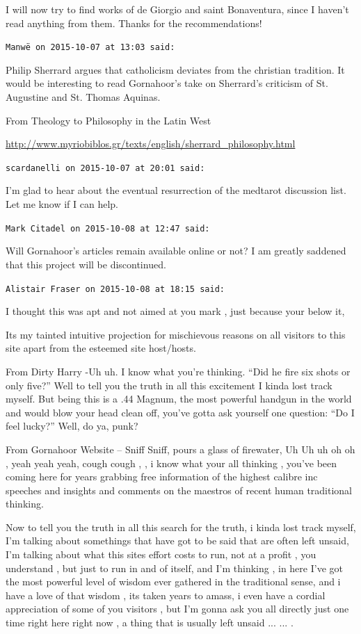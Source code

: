 \begin{footnotesize}
\begin{sffamily}
I will now try to find works of de Giorgio and saint Bonaventura, since I haven't read anything from them. Thanks for the recommendations!

\hfill

\texttt{Manwë on 2015-10-07 at 13:03 said:}

Philip Sherrard argues that catholicism deviates from the christian tradition. It would be interesting to read Gornahoor's take on Sherrard's criticism of St. Augustine and St. Thomas Aquinas.

From Theology to Philosophy in the Latin West

\url{http://www.myriobiblos.gr/texts/english/sherrard\_philosophy.html}


\hfill

\texttt{scardanelli on 2015-10-07 at 20:01 said:}

I'm glad to hear about the eventual resurrection of the medtarot discussion list. Let me know if I can help.

\hfill

\texttt{Mark Citadel on 2015-10-08 at 12:47 said:}

Will Gornahoor's articles remain available online or not? I am greatly saddened that this project will be discontinued.

\hfill

\texttt{Alistair Fraser on 2015-10-08 at 18:15 said:}

I thought this was apt and not aimed at you mark , just because your below it,

Its my tainted intuitive projection for mischievous reasons on all visitors to this site apart from the esteemed site host/hosts.

From Dirty Harry -Uh uh. I know what you're thinking. ``Did he fire six shots or only five?'' Well to tell you the truth in all this excitement I kinda lost track myself. But being this is a .44 Magnum, the most powerful handgun in the world and would blow your head clean off, you've gotta ask yourself one question: ``Do I feel lucky?'' Well, do ya, punk?

From Gornahoor Website -- Sniff Sniff, pours a glass of firewater, Uh Uh uh oh oh , yeah yeah yeah, cough cough , , i know what your all thinking , you've been coming here for years grabbing free information of the highest calibre inc speeches and insights and comments on the maestros of recent human traditional thinking.

Now to tell you the truth in all this search for the truth, i kinda lost track myself, I'm talking about somethings that have got to be said that are often left unsaid, I'm talking about what this sites effort costs to run, not at a profit , you understand , but just to run in and of itself, and I'm thinking , in here I've got the most powerful level of wisdom ever gathered in the traditional sense, and i have a love of that wisdom , its taken years to amass, i even have a cordial appreciation of some of you visitors , but I'm gonna ask you all directly just one time right here right now , a thing that is usually left unsaid
... ... .\\


\end{sffamily}
\end{footnotesize}
